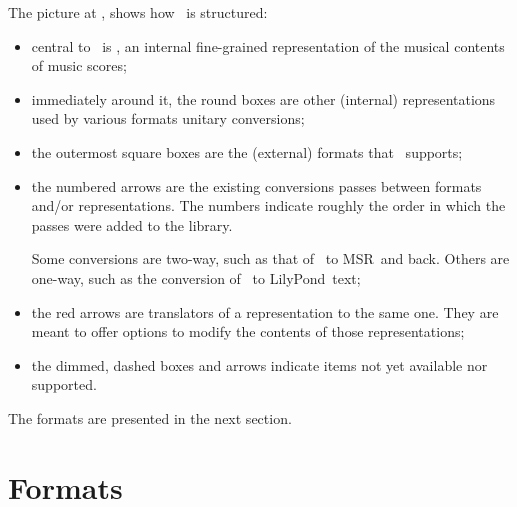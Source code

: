 The picture at , shows how \mf\ is structured:
\begin{itemize}
\item central to \mf\ is \msrRepr, an internal fine-grained representation of the musical contents of music scores;

\item immediately around it, the round boxes are other (internal) representations used by various formats unitary conversions;

\item the outermost square boxes are the (external) formats that \mf\ supports;

\item the numbered arrows are the existing conversions passes between formats and/or representations. The numbers indicate roughly the order in which the passes were added to the library.

Some conversions are two-way, such as that of \mxsrRepr\ to MSR\ and back. Others are one-way, such as the conversion of \lpsrRepr\ to LilyPond\ text;

\item the red arrows are translators of a representation to the same one. They are meant to offer options to modify the contents of those representations;

\item the dimmed, dashed boxes and arrows indicate items not yet available nor supported.

\end{itemize}

The formats are presented in the next section.


\chapter{Formats}\label{Formats}

